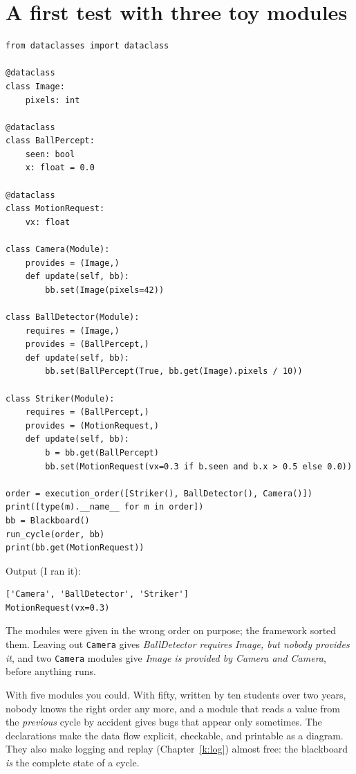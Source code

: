 \section*{A first test with three toy modules}
\begin{verbatim}
from dataclasses import dataclass

@dataclass
class Image:
    pixels: int

@dataclass
class BallPercept:
    seen: bool
    x: float = 0.0

@dataclass
class MotionRequest:
    vx: float

class Camera(Module):
    provides = (Image,)
    def update(self, bb):
        bb.set(Image(pixels=42))

class BallDetector(Module):
    requires = (Image,)
    provides = (BallPercept,)
    def update(self, bb):
        bb.set(BallPercept(True, bb.get(Image).pixels / 10))

class Striker(Module):
    requires = (BallPercept,)
    provides = (MotionRequest,)
    def update(self, bb):
        b = bb.get(BallPercept)
        bb.set(MotionRequest(vx=0.3 if b.seen and b.x > 0.5 else 0.0))

order = execution_order([Striker(), BallDetector(), Camera()])
print([type(m).__name__ for m in order])
bb = Blackboard()
run_cycle(order, bb)
print(bb.get(MotionRequest))
\end{verbatim}
Output (I ran it):
\begin{verbatim}
['Camera', 'BallDetector', 'Striker']
MotionRequest(vx=0.3)
\end{verbatim}
The modules were given in the wrong order on purpose; the framework sorted them. Leaving out \texttt{Camera} gives \emph{BallDetector requires Image, but nobody provides it}, and two \texttt{Camera} modules give \emph{Image is provided by Camera and Camera}, before anything runs.

\begin{aibox}
With five modules you could. With fifty, written by ten students over two years, nobody knows the right order any more, and a module that reads a value from the \emph{previous} cycle by accident gives bugs that appear only sometimes. The declarations make the data flow explicit, checkable, and printable as a diagram. They also make logging and replay (Chapter~\ref{k:log}) almost free: the blackboard \emph{is} the complete state of a cycle.
\end{aibox}

